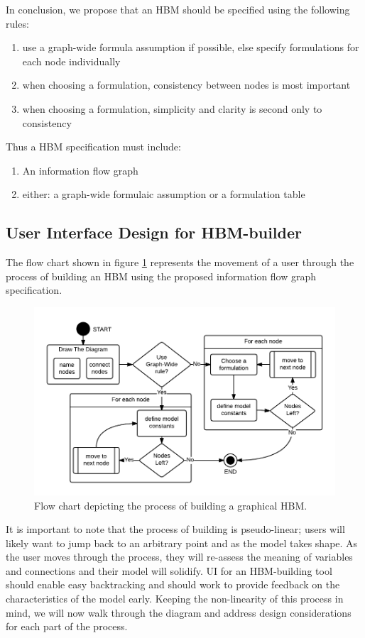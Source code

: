 \documentclass[conference]{IEEEtran}
\begin{document}
In conclusion, we propose that an HBM should be specified using the following rules:

\begin{enumerate}
  \item use a graph-wide formula assumption if possible, else specify formulations for each node individually
  \item when choosing a formulation, consistency between nodes is most important
  \item when choosing a formulation, simplicity and clarity is second only to consistency
\end{enumerate}
  
Thus a HBM specification must include:
\begin{enumerate}
  \item An information flow graph
  \item either: a graph-wide formulaic assumption or a formulation table 
\end{enumerate}

\subsection{User Interface Design for HBM-builder }
The flow chart shown in figure \ref{HBM-build-process} represents the movement of a user through the process of building an HBM using the proposed information flow graph specification.

\begin{figure}[!t]
  \centering
  \includegraphics[width=0.9\columnwidth]{img/HBM-build-process}
  \caption{Flow chart depicting the process of building a graphical HBM.}
  \label{HBM-build-process}
\end{figure}

It is important to note that the process of building is pseudo-linear; users will likely want to jump back to an arbitrary point and as the model takes shape. 
As the user moves through the process, they will re-assess the meaning of variables and connections and their model will solidify. 
UI for an HBM-building tool should enable easy backtracking and should work to provide feedback on the characteristics of the model early. 
Keeping the non-linearity of this process in mind, we will now walk through the diagram and address design considerations for each part of the process.
\end{document}
